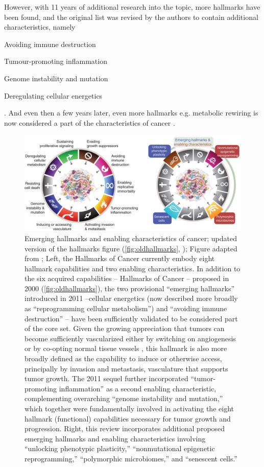 However, with 11 years of additional research into the topic, more hallmarks have been found, and the original list was revised by the authors to contain additional characteristics, namely 
\begin{enumerate*}
\item Avoiding immune destruction
\item Tumour-promoting inflammation
\item Genome instability and mutation
\item Deregulating cellular energetics
\end{enumerate*} \cite{Hanahan2011}. And even then a few years later, even more hallmarks e.g. metabolic rewiring is now considered a part of the characteristics of cancer \cite{Fouad2017}.


\begin{figure}[hbp]
\centering
\includegraphics[width=.9\linewidth]{Figures/intro/NewestHallmarksOfCancer.jpg}
\caption[Newest hallmarks of cancer]{Emerging hallmarks and enabling characteristics of cancer; updated version of the hallmarks figure (\autoref{fig:oldhallmarks}, \cite{Hanahan2000}); Figure adapted from \protect\textcite{Hanahan2022}; Left, the Hallmarks of Cancer currently embody eight hallmark capabilities and two enabling characteristics. In addition to the six acquired capabilities -- Hallmarks of Cancer -- proposed in 2000 (\autoref{fig:oldhallmarks}), the two provisional “emerging hallmarks” introduced in 2011 \cite{Hanahan2011} --cellular energetics (now described more broadly as “reprogramming cellular metabolism”) and “avoiding immune destruction” -- have been sufficiently validated to be considered part of the core set. Given the growing appreciation that tumors can become sufficiently vascularized either by switching on angiogenesis or by co-opting normal tissue vessels \cite{Kuczynski2019}, this hallmark is also more broadly defined as the capability to induce or otherwise access, principally by invasion and metastasis, vasculature that supports tumor growth. The 2011 sequel further incorporated “tumor-promoting inflammation” as a second enabling characteristic, complementing overarching “genome instability and mutation,” which together were fundamentally involved in activating the eight hallmark (functional) capabilities necessary for tumor growth and progression. Right, this review incorporates additional proposed emerging hallmarks and enabling characteristics involving “unlocking phenotypic plasticity,” “nonmutational epigenetic reprogramming,” “polymorphic microbiomes,” and “senescent cells.”}\label{fig:newesthallmarks}
\end{figure}

